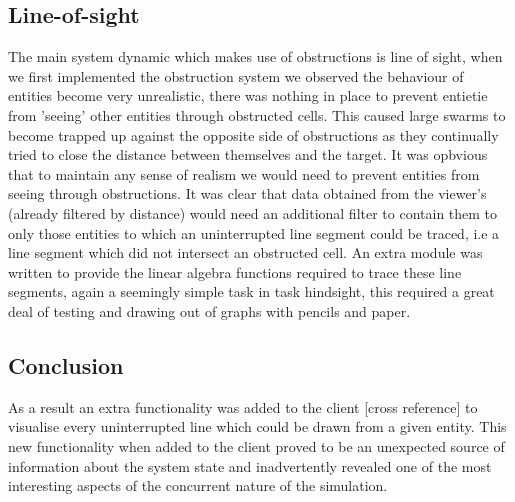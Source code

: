 \subsection{Line-of-sight}
The main system dynamic which makes use of obstructions is line of sight, when we first implemented the obstruction system we observed the behaviour of entities become very unrealistic, there was nothing in place to prevent entietie from 'seeing' other entities through obstructed cells. This caused large swarms to become trapped up against the opposite side of obstructions as they continually tried to close the distance between themselves and the target. It was opbvious that to maintain any sense of realism we would need to prevent entities from seeing through obstructions.
It was clear that data obtained from the viewer's (already filtered by distance) would need an additional filter to contain them to only those entities to which an uninterrupted line segment could be traced, i.e a line segment which did not intersect an obstructed cell. An extra module was written to provide the linear algebra functions required to trace these line segments, again a seemingly simple task in task hindsight, this required a great deal of testing and drawing out of graphs with pencils and paper.
\subsection{Conclusion}
As a result an extra functionality was added to the client [cross reference] to visualise every uninterrupted line which could be drawn from a given entity. This new functionality when added to the client proved to be an unexpected source of information about the system state and inadvertently revealed one of the most interesting aspects of the concurrent nature of the simulation.

\clearpage
\endinput
